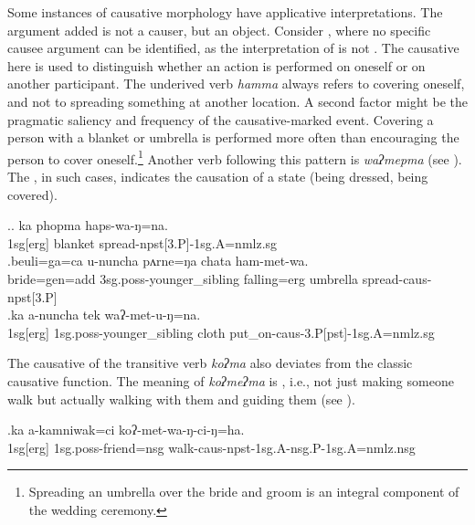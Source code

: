 Some instances of causative morphology have applicative interpretations. The argument added is not a causer, but an object. Consider \Next, where no specific causee argument can be identified, as the interpretation of \Next[b] is not . The causative here is used to distinguish whether an action is performed on oneself or on another participant. The underived verb \emph{hamma}  always refers to covering oneself, and not to spreading something at another location. A second factor might be the pragmatic saliency and frequency of the causative-marked event. Covering a person with a blanket or umbrella is performed more often than encouraging the person to cover oneself.\footnote{Spreading an umbrella over the bride and groom is an integral component of the wedding ceremony.} Another verb following this pattern is  \emph{waʔmepma}  (see \Next[c]). The , in such cases, indicates the causation of a state (being dressed, being covered).  


\ex.\ag. ka phopma haps-wa-ŋ=na.\\ 
{\sc 1sg[erg]} blanket spread{\sc -npst[3.P]-1sg.A=nmlz.sg}\\
\bg.beuli=ga=ca  u-nuncha pʌrne=ŋa   chata    ham-met-wa.\\
bride{\sc =gen=add} {\sc 3sg.poss-}younger\_sibling falling{\sc =erg} umbrella spread{\sc -caus-npst[3.P]}\\
  
\bg.ka a-nuncha tek waʔ-met-u-ŋ=na.\\
{\sc 1sg[erg]}  {\sc 1sg.poss-}younger\_sibling cloth put\_on{\sc -caus-3.P[pst]-1sg.A=nmlz.sg}\\


The causative of the transitive verb \emph{koʔma}  also deviates  from the classic causative function. The meaning of \emph{koʔmeʔma} is , i.e., not just making someone walk but actually walking with them and guiding them (see \Next). 

\exg.ka a-kamniwak=ci  koʔ-met-wa-ŋ-ci-ŋ=ha.\\
{\sc 1sg[erg]}  {\sc 1sg.poss-}friend{\sc =nsg} walk{\sc -caus-npst-1sg.A-nsg.P-1sg.A=nmlz.nsg} \\
 
